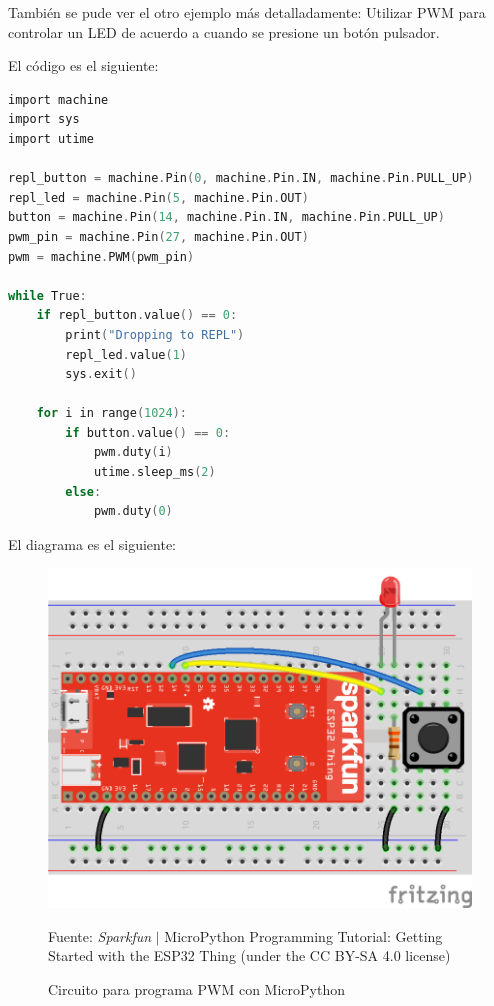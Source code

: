 \documentclass[conference]{IEEEtran}
\begin{document}
También se pude ver el otro ejemplo más detalladamente: Utilizar PWM para
controlar un LED de acuerdo a cuando se presione un botón pulsador.

\bigbreak

El código es el siguiente:

\begin{lstlisting}[language=C, caption={Programa que utiliza PWM en
MicroPython para ESP32. Fuente: Sparkfun Electronics \cite{hymel}.}]
import machine
import sys
import utime

repl_button = machine.Pin(0, machine.Pin.IN, machine.Pin.PULL_UP)
repl_led = machine.Pin(5, machine.Pin.OUT)
button = machine.Pin(14, machine.Pin.IN, machine.Pin.PULL_UP)
pwm_pin = machine.Pin(27, machine.Pin.OUT)
pwm = machine.PWM(pwm_pin)

while True:
    if repl_button.value() == 0:
        print("Dropping to REPL")
        repl_led.value(1)
        sys.exit()

    for i in range(1024):
        if button.value() == 0:
            pwm.duty(i)
            utime.sleep_ms(2)
        else:
            pwm.duty(0)
\end{lstlisting}

El diagrama es el siguiente:

\begin{figure}[H]
\centering
\includegraphics[width=0.3\paperwidth]{images/esp32-micropython-pwm-circuit}
\caption{Circuito para programa PWM con MicroPython} \footnotesize
Fuente: \textit{Sparkfun} $\mid$ MicroPython Programming Tutorial: Getting
Started with the ESP32 Thing \cite{hymel} (under the CC BY-SA 4.0 license)
\end{figure}
\end{document}
